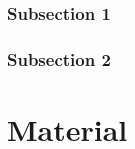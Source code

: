 \documentclass[justified]{tufte-book} %
\begin{document}
\subsection{Subsection 1}

\lipsum[9-10]

\subsection{Subsection 2}

\lipsum[11-12]



\chapter{Material}\label{ch:material}




\backmatter




\printindex %
\end{document}

